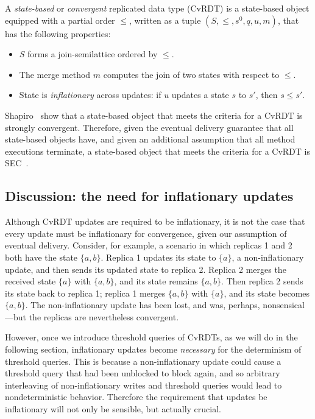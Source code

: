 A \emph{state-based} or \emph{convergent} replicated data type (CvRDT)
is a state-based object equipped with a partial order $\leq$, written
as a tuple
$(S, \leq, s^0, q, u, m)$, that has the following properties:
\begin{itemize}
\item $S$ forms a join-semilattice ordered by $\leq$.
\item The merge method $m$ computes the join of two
  states with respect to $\leq$.
\item State is \emph{inflationary} across updates: if $u$ updates a
  state $s$ to $s'$, then $s \leq s'$.
\end{itemize}
Shapiro \etal~show that a state-based object that meets the criteria
for a CvRDT is strongly convergent.  Therefore, given the eventual
delivery guarantee that all state-based objects have, and given an
additional assumption that all method executions terminate, a
state-based object that meets the criteria for a CvRDT is
SEC~\cite{crdts}.

\subsection{Discussion: the need for inflationary updates}

Although CvRDT updates are required to be inflationary, it is not the
case that every update must be inflationary for convergence, given our
assumption of eventual delivery.  Consider, for example, a scenario in
which replicas 1 and 2 both have the state $\{a, b\}$. Replica 1
updates its state to $\{a\}$, a non-inflationary update, and then
sends its updated state to replica 2.  Replica 2 merges the received
state $\{a\}$ with $\{a, b\}$, and its state remains $\{a, b\}$. Then
replica 2 sends its state back to replica 1; replica 1 merges $\{a,
b\}$ with $\{a\}$, and its state becomes $\{a, b\}$.  The
non-inflationary update has been lost, and was, perhaps,
nonsensical---but the replicas are nevertheless convergent.

However, once we introduce threshold queries of CvRDTs, as we will do
in the following section, inflationary updates become \emph{necessary}
for the determinism of threshold queries.  This is because a
non-inflationary update could cause a threshold query that had been
unblocked to block again, and so arbitrary interleaving of
non-inflationary writes and threshold queries would lead to
nondeterministic behavior.  Therefore the requirement that updates be
inflationary will not only be sensible, but actually crucial.

